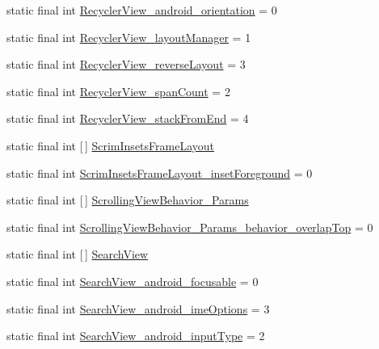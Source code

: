 \begin{DoxyCompactItemize}
\item 
static final int \hyperlink{classproject4_1_1xaria_1_1R_1_1styleable_a6b1fb1c1d7e84b9198ebbe7e20465f86}{Recycler\+View\+\_\+android\+\_\+orientation} = 0
\item 
static final int \hyperlink{classproject4_1_1xaria_1_1R_1_1styleable_aa9cec08b1f2e28b73fb9eed845399b00}{Recycler\+View\+\_\+layout\+Manager} = 1
\item 
static final int \hyperlink{classproject4_1_1xaria_1_1R_1_1styleable_a3ea954156e7ab808e833eaff0274d45f}{Recycler\+View\+\_\+reverse\+Layout} = 3
\item 
static final int \hyperlink{classproject4_1_1xaria_1_1R_1_1styleable_a7ecd16415effb7a235b31c1193ed8b2f}{Recycler\+View\+\_\+span\+Count} = 2
\item 
static final int \hyperlink{classproject4_1_1xaria_1_1R_1_1styleable_a1ef8e9797ba63acf022ba0898d24b5a1}{Recycler\+View\+\_\+stack\+From\+End} = 4
\item 
static final int \mbox{[}$\,$\mbox{]} \hyperlink{classproject4_1_1xaria_1_1R_1_1styleable_aced6ff23371b3f5a2ea43a4c9a57f9eb}{Scrim\+Insets\+Frame\+Layout}
\item 
static final int \hyperlink{classproject4_1_1xaria_1_1R_1_1styleable_aee9aa1668c508a1199d8a4083336018f}{Scrim\+Insets\+Frame\+Layout\+\_\+inset\+Foreground} = 0
\item 
static final int \mbox{[}$\,$\mbox{]} \hyperlink{classproject4_1_1xaria_1_1R_1_1styleable_ad06c19e0a242a55e8ea1a03b55b964d9}{Scrolling\+View\+Behavior\+\_\+\+Params}
\item 
static final int \hyperlink{classproject4_1_1xaria_1_1R_1_1styleable_a8ca20a5a852719ef409f39f9b80e31d0}{Scrolling\+View\+Behavior\+\_\+\+Params\+\_\+behavior\+\_\+overlap\+Top} = 0
\item 
static final int \mbox{[}$\,$\mbox{]} \hyperlink{classproject4_1_1xaria_1_1R_1_1styleable_a6308d960f6e1e05e5316efa4904fedfc}{Search\+View}
\item 
static final int \hyperlink{classproject4_1_1xaria_1_1R_1_1styleable_aca8cb79e239b187a7e1a1c50e50fc025}{Search\+View\+\_\+android\+\_\+focusable} = 0
\item 
static final int \hyperlink{classproject4_1_1xaria_1_1R_1_1styleable_ac7730714223b84a0e0622950d9a58955}{Search\+View\+\_\+android\+\_\+ime\+Options} = 3
\item 
static final int \hyperlink{classproject4_1_1xaria_1_1R_1_1styleable_abeede1e9e7d3bcc49ce1e88e2b589cb0}{Search\+View\+\_\+android\+\_\+input\+Type} = 2
\item 

\end{DoxyCompactItemize}
